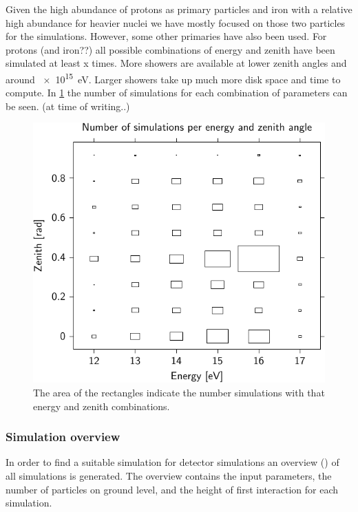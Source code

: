 Given the high abundance of protons as primary particles and iron with a
relative high abundance for heavier nuclei we have mostly focused on
those two particles for the simulations. However, some other primaries
have also been used. For protons (and iron??) all possible combinations
of energy and zenith have been simulated at least x times. More showers
are available at lower zenith angles and around
\SI{e15}{\electronvolt}. Larger showers take up much more disk
space and time to compute. In \ref{fig:simulations_proton_energy_zenith}
the number of simulations for each combination of parameters can be seen.
(at time of writing..)


\begin{figure}
    \centering
    \includegraphics[width=0.7\linewidth]
        {plots/simulations/proton_energy_zenith}
    \caption{ The area of the
             rectangles indicate the number simulations with that energy
             and zenith combinations.}
    \label{fig:simulations_proton_energy_zenith}
\end{figure}


\subsubsection{Simulation overview}

In order to find a suitable \corsika simulation for detector simulations
an overview (\hdf) of all \corsika simulations is generated. The
overview contains the input parameters, the number of particles on
ground level, and the height of first interaction for each simulation.


